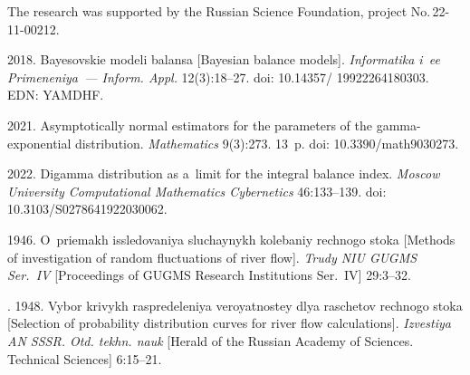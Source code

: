 




\vspace*{-12pt}

\Ack


\vspace*{-3pt}

\noindent
The research was supported by the Russian Science Foundation, project No.\,22-11-00212.

\vspace*{6pt}

  \begin{multicols}{2}

\renewcommand{\bibname}{\protect\rmfamily References}



{\small\frenchspacing
 {%
 \begin{thebibliography}{99}
 2018. 
Bayesovskie modeli ba\-lan\-sa [Bayesian balance models].
\textit{Informatika i~ee Primeneniya~--- Inform. Appl.} 12(3):18--27.
doi: 10.14357/ 19922264180303. EDN: YAMDHF.


 2021. 
Asymptotically normal estimators for the parameters of the gamma-exponential distribution.
\textit{Mathematics} 9(3):273. 13~p. doi: 10.3390/math9030273.

 2022.
Digamma distribution as a~limit for the integral balance index. 
\textit{Moscow University Computational Mathematics Cybernetics} 46:133--139.
doi: 10.3103/S0278641922030062.

 1946. 
O~priemakh issledovaniya sluchaynykh kolebaniy rechnogo stoka [Methods
of investigation of random fluctuations of river flow]. \textit{Trudy
NIU GUGMS Ser.~IV} [Proceedings of GUGMS Research
Institutions Ser.~IV] 29:3--32.

. 1948. Vybor krivykh
raspredeleniya veroyatnostey dlya raschetov rechnogo stoka [Selection of probability distribution curves for river
flow calculations]. \textit{Izvestiya AN SSSR. Otd. tekhn. nauk}
[Herald of the Russian Academy of Sciences. Technical
Sciences] 6:15--21.


\end{thebibliography}}}
\end{multicols}

